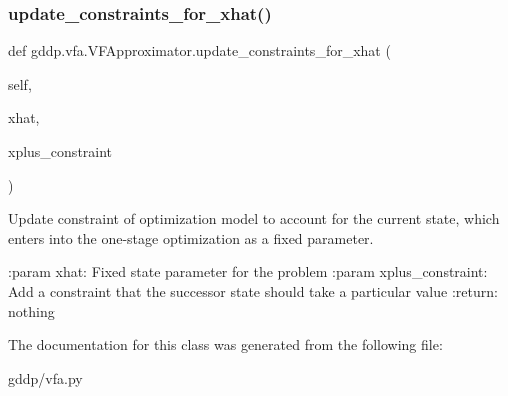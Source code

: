 \subsubsection{\texorpdfstring{update\_constraints\_for\_xhat()}{update\_constraints\_for\_xhat()}}
{\footnotesize\ttfamily def gddp.\+vfa.\+V\+F\+Approximator.\+update\+\_\+constraints\+\_\+for\+\_\+xhat (\begin{DoxyParamCaption}\item[{}]{self,  }\item[{}]{xhat,  }\item[{}]{xplus\+\_\+constraint }\end{DoxyParamCaption})}

\begin{DoxyVerb}Update constraint of optimization model to account for the current state, which enters
into the one-stage optimization as a fixed parameter.

:param xhat: Fixed state parameter for the problem
:param xplus_constraint: Add a constraint that the successor state should take a particular
value
:return: nothing
\end{DoxyVerb}
 

The documentation for this class was generated from the following file\+:\begin{DoxyCompactItemize}
\item 
gddp/vfa.\+py\end{DoxyCompactItemize}
